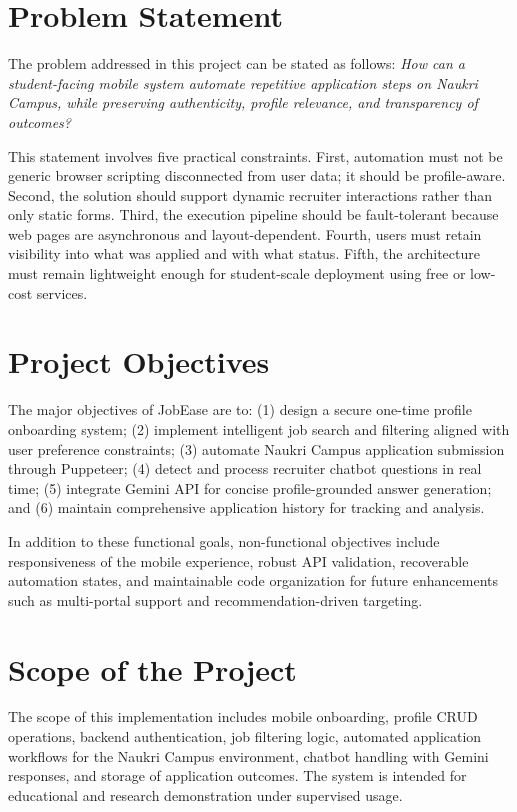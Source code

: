 \documentclass[12pt,a4paper,oneside]{report}
\begin{document}
\section{Problem Statement}
The problem addressed in this project can be stated as follows: \textit{How can a student-facing mobile system automate repetitive application steps on Naukri Campus, while preserving authenticity, profile relevance, and transparency of outcomes?}

This statement involves five practical constraints. First, automation must not be generic browser scripting disconnected from user data; it should be profile-aware. Second, the solution should support dynamic recruiter interactions rather than only static forms. Third, the execution pipeline should be fault-tolerant because web pages are asynchronous and layout-dependent. Fourth, users must retain visibility into what was applied and with what status. Fifth, the architecture must remain lightweight enough for student-scale deployment using free or low-cost services.

\section{Project Objectives}
The major objectives of JobEase are to: (1) design a secure one-time profile onboarding system; (2) implement intelligent job search and filtering aligned with user preference constraints; (3) automate Naukri Campus application submission through Puppeteer; (4) detect and process recruiter chatbot questions in real time; (5) integrate Gemini API for concise profile-grounded answer generation; and (6) maintain comprehensive application history for tracking and analysis.

In addition to these functional goals, non-functional objectives include responsiveness of the mobile experience, robust API validation, recoverable automation states, and maintainable code organization for future enhancements such as multi-portal support and recommendation-driven targeting.

\section{Scope of the Project}
The scope of this implementation includes mobile onboarding, profile CRUD operations, backend authentication, job filtering logic, automated application workflows for the Naukri Campus environment, chatbot handling with Gemini responses, and storage of application outcomes. The system is intended for educational and research demonstration under supervised usage.
\end{document}
